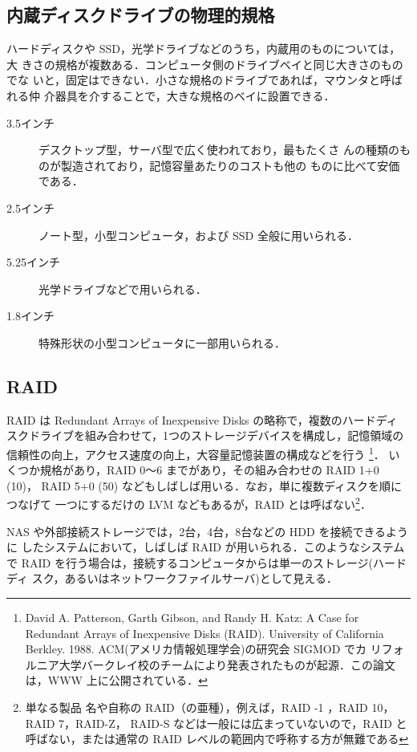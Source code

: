 \subsection*{内蔵ディスクドライブの物理的規格}

ハードディスクや SSD，光学ドライブなどのうち，内蔵用のものについては，大
きさの規格が複数ある．コンピュータ側のドライブベイと同じ大きさのものでな
いと，固定はできない．小さな規格のドライブであれば，マウンタと呼ばれる仲
介器具を介することで，大きな規格のベイに設置できる．

\begin{description}
 \item[3.5インチ] デスクトップ型，サーバ型で広く使われており，最もたくさ
	    んの種類のものが製造されており，記憶容量あたりのコストも他の
	    ものに比べて安価である．
 \item[2.5インチ] ノート型，小型コンピュータ，および SSD 全般に用いられる．
 \item[5.25インチ] 光学ドライブなどで用いられる．
 \item[1.8インチ] 特殊形状の小型コンピュータに一部用いられる．
\end{description}


\subsection*{RAID}

RAID は Redundant Arrays of Inexpensive Disks の略称で，複数のハードディ
スクドライブを組み合わせて，1つのストレージデバイスを構成し，記憶領域の
信頼性の向上，アクセス速度の向上，大容量記憶装置の構成などを行う
\footnote{David A. Patterson, Garth Gibson, and Randy H. Katz: A Case
for Redundant Arrays of Inexpensive Disks (RAID). University of
California Berkley. 1988. ACM(アメリカ情報処理学会)の研究会 SIGMOD でカ
リフォルニア大学バークレイ校のチームにより発表されたものが起源．この論文
は，WWW 上に公開されている．}．
いくつか規格があり，RAID 0〜6 までがあり，その組み合わせの RAID 1+0 (10)，
RAID 5+0 (50) などもしばしば用いる．なお，単に複数ディスクを順につなげて
一つにするだけの LVM などもあるが，RAID とは呼ばない\footnote{単なる製品
名や自称の RAID（の亜種），例えば，RAID -1 ，RAID 10，RAID 7，RAID-Z，
RAID-S などは一般には広まっていないので，RAID と呼ばない，または通常の 
RAID レベルの範囲内で呼称する方が無難である}．

NAS や外部接続ストレージでは，2台，4台，8台などの HDD を接続できるように
したシステムにおいて，しばしば RAID が用いられる．このようなシステムで
RAID を行う場合は，接続するコンピュータからは単一のストレージ(ハードディ
スク，あるいはネットワークファイルサーバ)として見える．

